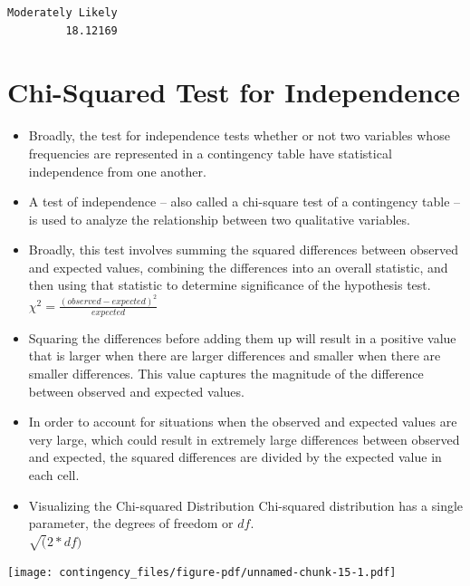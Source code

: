 \documentclass[
  letterpaper,
  DIV=11,
  numbers=noendperiod]{scrreprt}
\begin{document}
\begin{verbatim}
Moderately Likely 
         18.12169 
\end{verbatim}


\chapter{Chi-Squared Test for
Independence}\label{chi-squared-test-for-independence}

\begin{itemize}
\item
  Broadly, the test for independence tests whether or not two variables
  whose frequencies are represented in a contingency table have
  statistical independence from one another.
\item
  A test of independence -- also called a chi-square test of a
  contingency table -- is used to analyze the relationship between two
  qualitative variables.
\item
  Broadly, this test involves summing the squared differences between
  observed and expected values, combining the differences into an
  overall statistic, and then using that statistic to determine
  significance of the hypothesis test.\\
  \(\chi^2 = \frac{(observed-expected)^2}{expected}\)
\item
  Squaring the differences before adding them up will result in a
  positive value that is larger when there are larger differences and
  smaller when there are smaller differences. This value captures the
  magnitude of the difference between observed and expected values.
\item
  In order to account for situations when the observed and expected
  values are very large, which could result in extremely large
  differences between observed and expected, the squared differences are
  divided by the expected value in each cell.
\item
  Visualizing the Chi-squared Distribution Chi-squared distribution has
  a single parameter, the degrees of freedom or \(df\).\\
  \(\sqrt(2*df)\)
\end{itemize}

\texttt{[image: contingency\_files/figure-pdf/unnamed-chunk-15-1.pdf]}
\end{document}
